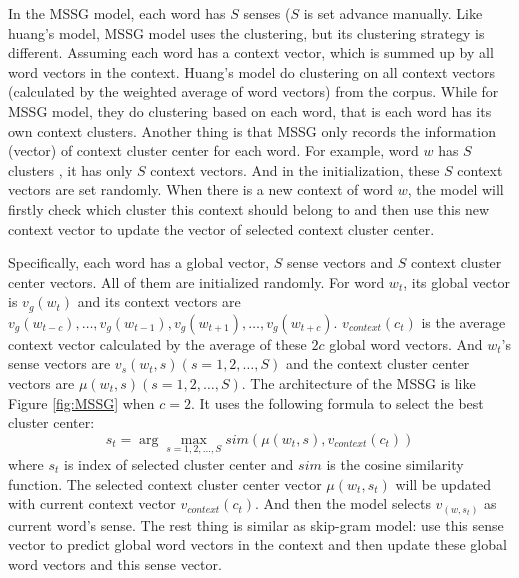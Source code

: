 In the MSSG model, each word has $S$ senses ($S$ is set advance manually. Like huang's model, MSSG model uses the clustering, but its clustering strategy is different. Assuming each word has a context vector, which is summed up by all word vectors in the context. Huang's model do clustering on all context vectors (calculated by the weighted average of word vectors) from the corpus. While for MSSG model, they do clustering based on each word, that is each word has its own context clusters. Another thing is that MSSG only records the information (vector) of context cluster center for each word. For example, word $w$ has $S$ clusters , it has only $S$ context vectors. And in the initialization, these $S$ context vectors are set randomly. When there is a new context of word $w$, the model will firstly check which cluster this context should belong to and then use this new context vector to update the vector of selected context cluster center. 

Specifically, each word has a global vector, $S$ sense vectors and $S$ context cluster center vectors. All of them are initialized randomly. For word $w_t$, its global vector is $v_g(w_t)$ and its context vectors are $v_g(w_{t-c}),\ldots,v_g(w_{t-1}),v_g(w_{t+1}),\ldots,v_g(w_{t+c})$. $v_{context}(c_t)$ is the average context vector calculated by the average of these $2c$ global word vectors. And $w_t$'s sense vectors are $v_s(w_t,s) (s=1,2,\ldots,S)$ and the context cluster center vectors are $\mu(w_t,s) (s=1,2,\ldots,S)$. The architecture of the MSSG is like Figure \ref{fig:MSSG} when $c=2$. It uses the following formula to select the best cluster center:
$$s_t=\arg\max_{s=1,2,\ldots,S} sim(\mu(w_t,s),v_{context}(c_t)) $$
where $s_t$ is index of selected cluster center and $sim$ is the cosine similarity function. The selected context cluster center vector $\mu(w_t,s_t)$ will be updated with current context vector $v_{context}(c_t)$. And then the model selects $v_(w,s_t)$ as current word's sense. The rest thing is similar as skip-gram model: use this sense vector to predict global word vectors in the context and then update these global word vectors and this sense vector.


